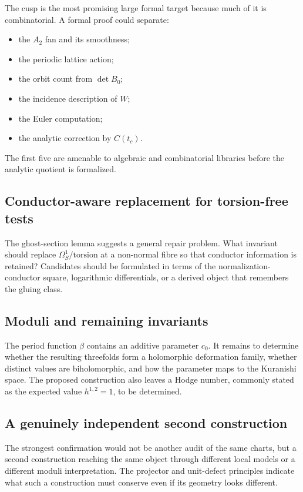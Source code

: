 \documentclass[11pt,reqno]{amsart}
\numberwithin{equation}{section}
\theoremstyle{definition}
\begin{document}
The cusp is the most promising large formal target because much of it is combinatorial. A formal proof could separate:
\begin{itemize}
\item the $A_2$ fan and its smoothness;
\item the periodic lattice action;
\item the orbit count from $\det B_0$;
\item the incidence description of $W$;
\item the Euler computation;
\item the analytic correction by $C(t_c)$.
\end{itemize}
The first five are amenable to algebraic and combinatorial libraries before the analytic quotient is formalized.

\subsection{Conductor-aware replacement for torsion-free tests}

The ghost-section lemma suggests a general repair problem. What invariant should replace $\Omega_S^1/\mathrm{torsion}$ at a non-normal fibre so that conductor information is retained? Candidates should be formulated in terms of the normalization-conductor square, logarithmic differentials, or a derived object that remembers the gluing class.

\subsection{Moduli and remaining invariants}

The period function $\beta$ contains an additive parameter $c_0$. It remains to determine whether the resulting threefolds form a holomorphic deformation family, whether distinct values are biholomorphic, and how the parameter maps to the Kuranishi space. The proposed construction also leaves a Hodge number, commonly stated as the expected value $h^{1,2}=1$, to be determined.

\subsection{A genuinely independent second construction}

The strongest confirmation would not be another audit of the same charts, but a second construction reaching the same object through different local models or a different moduli interpretation. The projector and unit-defect principles indicate what such a construction must conserve even if its geometry looks different.
\end{document}
